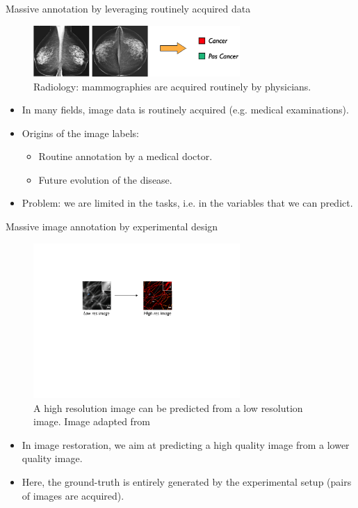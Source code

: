 \documentclass[xcolor=pdftex,dvipsnames,table]{beamer}
\begin{document}
\begin{frame}{Massive annotation by leveraging routinely acquired data}
\begin{figure}[htb]
   \centering
   \includegraphics[width=0.7\textwidth]{../graphics/radiology.pdf}
   \caption{Radiology: mammographies are acquired routinely by physicians.}
\end{figure}
\begin{itemize}
   \item In many fields, image data is routinely acquired (e.g. medical examinations). 
   \item Origins of the image labels:
   \begin{itemize}
      \item Routine annotation by a medical doctor.
      \item Future evolution of the disease.
   \end{itemize}
   \item Problem: we are limited in the tasks, i.e. in the variables that we can predict. 
\end{itemize}
\end{frame}

\begin{frame}{Massive image annotation by experimental design}
\begin{figure}[htb]
   \centering
   \includegraphics[width=0.7\textwidth]{../graphics/super_resolution.pdf}
   \caption{A high resolution image can be predicted from a low resolution image. Image adapted from \cite{Ouyang2018}}
\end{figure}
\begin{itemize}
   \item In image restoration, we aim at predicting a high quality image from a lower quality image. 
   \item Here, the ground-truth is entirely generated by the experimental setup (pairs of images are acquired). 
\end{itemize}
\end{frame}
\end{document}
